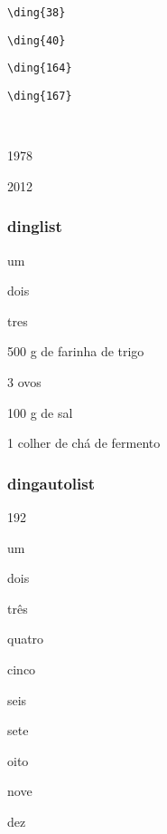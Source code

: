\documentclass[a4paper]{article}
\begin{document}
\verb|\ding{38}| 

\verb|\ding{40}| 

\verb|\ding{164}| 

\verb|\ding{167}| 

\

 1978

 2012


\subsubsection*{dinglist}

\begin{dinglist}{43}
 \item um
 \item dois
 \item tres
\end{dinglist}

\begin{dinglist}{51}
 \item 500 g de farinha de trigo
 \item 3 ovos
\end{dinglist}

\begin{dinglist}{55}
 \item 100 g de sal
\end{dinglist}

\begin{dinglist}{51}
 \item 1 colher de chá de fermento
\end{dinglist}


\subsubsection*{dingautolist}

\begin{dingautolist}{192}
 \item um
 \item dois
 \item três
 \item quatro
 \item cinco
 \item seis
 \item sete
 \item oito
 \item nove
 \item dez
\end{dingautolist}
\end{document}

